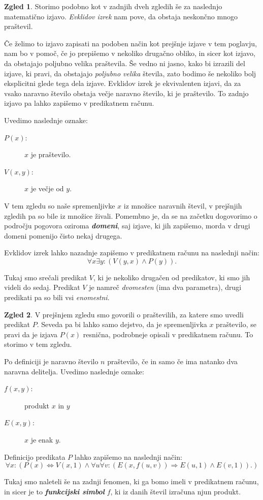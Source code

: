 \documentclass[11pt]{book}
\def\definicija{\color{rdeca}\bf\em}
\theoremstyle{definition}
\theoremstyle{zgled}
\newtheorem*{zgled}{Zgled}
\theoremstyle{odprtproblem}
\theoremstyle{domacanaloga}
\theoremstyle{izrek}
\begin{document}
\begin{zgled}
Storimo podobno kot v zadnjih dveh zgledih še za naslednjo matematično izjavo. \emph{Evklidov izrek} nam pove, da obstaja neskončno mnogo praštevil. 

Če želimo to izjavo zapisati na podoben način kot prejšnje izjave v tem poglavju, nam bo v pomoč, če jo prepišemo v nekoliko drugačno obliko, in sicer kot izjavo, da obstajajo poljubno velika praštevila. Še vedno ni jasno, kako bi izrazili del izjave, ki pravi, da obstajajo \emph{poljubno velika} števila, zato bodimo še nekoliko bolj eksplicitni glede tega dela izjave. Evklidov izrek je ekvivalenten izjavi, da za vsako naravno število obstaja večje naravno število, ki je praštevilo. To zadnjo izjavo pa lahko zapišemo v predikatnem računu. 

Uvedimo naslednje oznake:

\begin{description}
    \item[$P(x)$:] $x$ je praštevilo.
    \item[$V(x,y)$:] $x$ je večje od $y$.
\end{description}

V tem zgledu so naše spremenljivke $x$ iz množice naravnih števil, v prejšnjih zgledih pa so bile iz množice živali. Pomembno je, da se na začetku dogovorimo o področju pogovora oziroma {\definicija domeni}, saj izjave, ki jih zapišemo, morda v drugi domeni pomenijo čisto nekaj drugega.

Evklidov izrek lahko nazadnje zapišemo v predikatnem računu na naslednji način:
\[
    \forall x \exists y \colon (V(y,x) \land P(y)).
\]

Tukaj smo srečali predikat $V$, ki je nekoliko drugačen od predikatov, ki smo jih videli do sedaj. Predikat $V$ je namreč \emph{dvomesten} (ima dva parametra), drugi predikati pa so bili vsi \emph{enomestni}.
\end{zgled}

\begin{zgled}
V prejšnjem zgledu smo govorili o praštevilih, za katere smo uvedli predikat $P$. Seveda pa bi lahko samo dejstvo, da je spremenljivka $x$ praštevilo, se pravi da je izjava $P(x)$ resnična, podrobneje opisali v predikatnem računu. To storimo v tem zgledu.

Po definiciji je naravno število $n$ praštevilo, če in samo če ima natanko dva naravna delitelja. Uvedimo naslednje oznake:

\begin{description}
    \item[$f(x,y)$:] produkt $x$ in $y$
    \item[$E(x,y)$:] $x$ je enak $y$.
\end{description}

Definicijo predikata $P$ lahko zapišemo na naslednji način:
\[
    \forall x \colon \left( 
    P(x) \Leftrightarrow V(x,1) \land \forall u \forall v \colon ( E(x, f(u,v)) \Rightarrow E(u,1) \land E(v,1) ).
    \right)
\]

Tukaj smo naleteli še na zadnji fenomen, ki ga bomo imeli v predikatnem računu, in sicer je to {\definicija funkcijski simbol} $f$, ki iz danih števil izračuna njun produkt.
\end{zgled}
\end{document}
